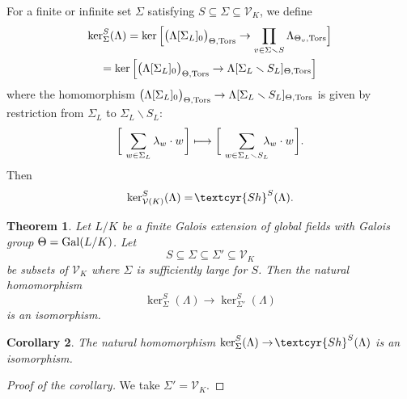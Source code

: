 \documentclass[11pt]{amsart}
\newcommand{\Sha}{{\!\textcyr{Sh}}}
\theoremstyle{plain}
\newtheorem{theorem}{Theorem}[section]
\newtheorem{corollary}[theorem]{Corollary}
\theoremstyle{definition}
\newcommand{\Gal}{{\rm Gal}}
\newcommand{\hs}{\kern 0.8pt}
\newcommand{\V}{{\mathcal V}}
\newcommand{\Tors}{{\rm Tors}}
\newcommand{\Thvt}{{\Theta_v,\Tors}}
\newcommand{\Tht}{{\Theta,\Tors}}
\begin{document}
For a finite or infinite set $\Sigma$ satisfying $S\subseteq\Sigma\subseteq\V_K$,
we define
\begin{multline*}
\ker_\Sigma^S(\Lambda)=\ker \Big[\big(\Lambda[\Sigma_L]_0\big)_\Tht\to \prod_{v\in \Sigma\smallsetminus S}\Lambda_\Thvt\Big]\\
   =\ker \Big[\big(\Lambda[\Sigma_L]_0\big)_\Tht\to \Lambda[\Sigma_L\smallsetminus S_L]_\Tht\Big]
\end{multline*}
where the homomorphism $\big(\Lambda[\Sigma_L]_0\big)_\Tht\to \Lambda[\Sigma_L\smallsetminus S_L]_\Tht$ is given by restriction from $\Sigma_L$ to $\Sigma_L\smallsetminus S_L$\hs:
\[ \bigg[\,\sum_{w\in \Sigma_L} \lambda_w\cdot w\hs\bigg]\longmapsto
    \bigg[\,\sum_{w\in \Sigma_L\smallsetminus S_L}\!\!\!\! \lambda_w\cdot w\hs\bigg].\]
Then
\[ \ker^S_{\V(K)}(\Lambda)=\Sha^S(\Lambda).\]


\begin{theorem}\label{t:Sigma'}
Let $L/K$ be a finite Galois extension of global fields with Galois group $\Theta=\Gal(L/K)$.
Let
\[ S\subseteq\Sigma\subseteq\Sigma'\subseteq\V_K\]
be subsets of $\V_K$ where $\Sigma$ is sufficiently large for $S$.
Then the natural homomorphism
\[\ker^S_\Sigma(\Lambda)\to\ker^S_{\Sigma'}(\Lambda)\]
is an isomorphism.
\end{theorem}

\begin{corollary}\label{c:Sigma}
The natural homomorphism
$\ker^S_\Sigma(\Lambda)\to\Sha^S(\Lambda)$
is an isomorphism.
\end{corollary}

\begin{proof}[Proof of the corollary] We take $\Sigma'=\V_K$.\end{proof}
\end{document}

